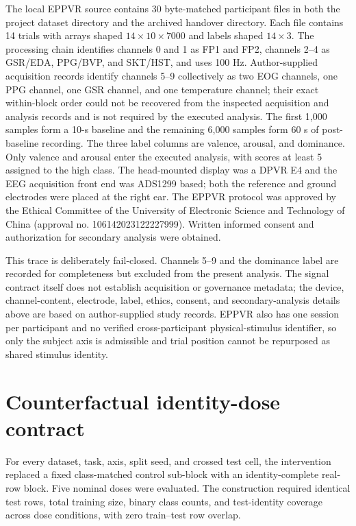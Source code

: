 \documentclass[preprint,12pt]{elsarticle}
\begin{document}
\begingroup
\small
\setlength{\tabcolsep}{3pt}
\renewcommand{\arraystretch}{1.08}

\endgroup

The local EPPVR source contains 30 byte-matched participant files in both the project dataset directory and the archived handover directory. Each file contains 14 trials with arrays shaped $14\times10\times7000$ and labels shaped $14\times3$. The processing chain identifies channels 0 and 1 as FP1 and FP2, channels 2--4 as GSR/EDA, PPG/BVP, and SKT/HST, and uses 100 Hz. Author-supplied acquisition records identify channels 5--9 collectively as two EOG channels, one PPG channel, one GSR channel, and one temperature channel; their exact within-block order could not be recovered from the inspected acquisition and analysis records and is not required by the executed analysis. The first 1,000 samples form a 10-s baseline and the remaining 6,000 samples form 60 s of post-baseline recording. The three label columns are valence, arousal, and dominance. Only valence and arousal enter the executed analysis, with scores at least 5 assigned to the high class. The head-mounted display was a DPVR E4 and the EEG acquisition front end was ADS1299 based; both the reference and ground electrodes were placed at the right ear. The EPPVR protocol was approved by the Ethical Committee of the University of Electronic Science and Technology of China (approval no. 106142023122227999). Written informed consent and authorization for secondary analysis were obtained.

This trace is deliberately fail-closed. Channels 5--9 and the dominance label are recorded for completeness but excluded from the present analysis. The signal contract itself does not establish acquisition or governance metadata; the device, channel-content, electrode, label, ethics, consent, and secondary-analysis details above are based on author-supplied study records. EPPVR also has one session per participant and no verified cross-participant physical-stimulus identifier, so only the subject axis is admissible and trial position cannot be repurposed as shared stimulus identity.

\section{Counterfactual identity-dose contract}

For every dataset, task, axis, split seed, and crossed test cell, the intervention replaced a fixed class-matched control sub-block with an identity-complete real-row block. Five nominal doses were evaluated. The construction required identical test rows, total training size, binary class counts, and test-identity coverage across dose conditions, with zero train--test row overlap.
\end{document}
